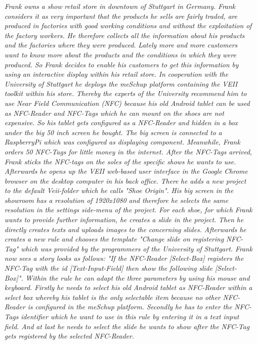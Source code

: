 \textit{
Frank owns a show retail store in downtown of Stuttgart in Germany. Frank considers it as very important that the products he sells are fairly traded, are produced in factories with good working conditions and without the exploitation of the factory workers. He therefore collects all the information about his products and the factories where they were produced. Lately more and more customers want to know more about the products and the conditions in which they were produced. So Frank decides to enable his customers to get this information by using an interactive display within his retail store.
In cooperation with the University of Stuttgart he deploys the meSchup platform containing the VEII toolkit within his store. Thereby the experts of the University recommend him to use Near Field Communication (NFC) because his old Android tablet can be used as NFC-Reader and NFC-Tags which he can mount on the shoes are not expensive. So his tablet gets configured as a NFC-Reader and hidden in a box under the big 50 inch screen he bought. The big screen is connected to a RaspberryPi which was configured as displaying component. Meanwhile, Frank orders 50 NFC-Tags for little money in the internet. After the NFC-Tags arrived, Frank sticks the NFC-tags on the soles of the specific shows he wants to use. Afterwards he opens up the VEII web-based user interface in the Google Chrome browser on the desktop computer in his back office. There he adds a new project to the default Veii-folder which he calls "Shoe Origin". His big screen in the showroom has a resolution of 1920x1080 and therefore he selects the same resolution in the settings side-menu of the project. For each shoe, for which Frank wants to provide further information, he creates a slide in the project. Then he directly creates texts and uploads images to the concerning slides. Afterwards he creates a new rule and chooses the template "Change slide on registering NFC-Tag" which was provided by the programmers of the University of Stuttgart. Frank now sees a story looks as follows: "If the NFC-Reader [Select-Box] registers the NFC-Tag with the id [Text-Input-Field] then show the following slide [Select-Box]". Within the rule he can adapt the three parameters by using his mouse and keyboard. Firstly he needs to select his old Android tablet as NFC-Reader within a select box whereby his tablet is the only selectable item because no other NFC-Reader is configured in the meSchup platform. Secondly he has to enter the NFC-Tags identifier which he want to use in this rule by entering it in a text input field. And at last he needs to select the slide he wants to show after the NFC-Tag gets registered by the selected NFC-Reader.
}
